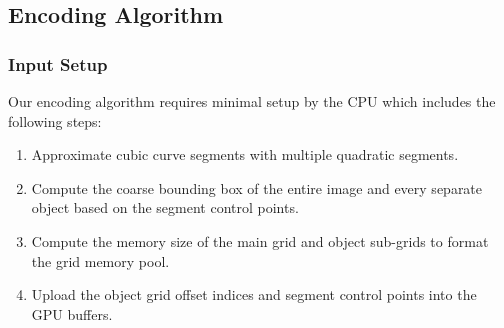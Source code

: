 \documentclass[11pt,a4paper,twoside]{article}
\begin{document}
%
%


\subsection {Encoding Algorithm}

\subsubsection {Input Setup}

Our encoding algorithm requires minimal setup by the CPU which includes the following steps:

\begin {enumerate}
\item
Approximate cubic curve segments with multiple quadratic segments.
\item
Compute the coarse bounding box of the entire image and every separate object based on the segment control points.
\item
Compute the memory size of the main grid and object sub-grids to format the grid memory pool.
\item
Upload the object grid offset indices and segment control points into the GPU buffers.
\end {enumerate}
\end{document}
